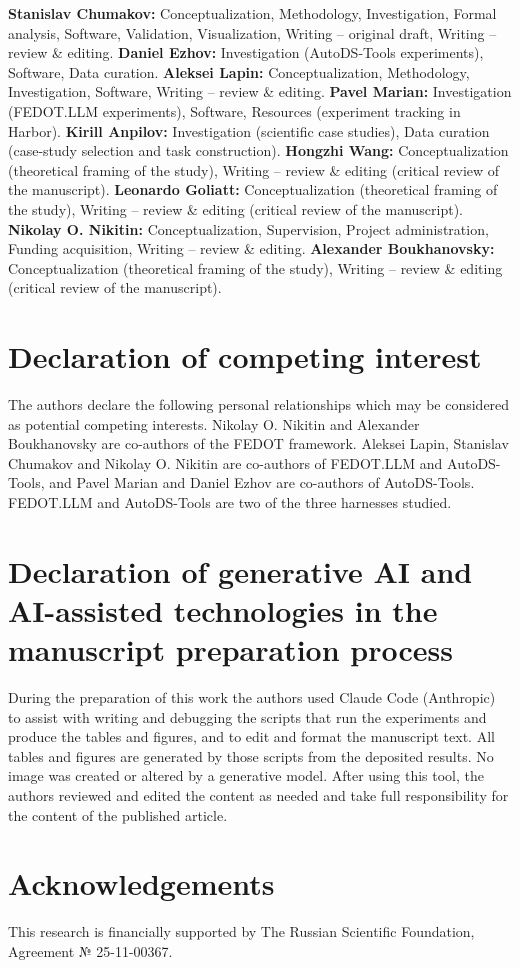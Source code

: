 \textbf{Stanislav Chumakov:} Conceptualization, Methodology, Investigation,
Formal analysis, Software, Validation, Visualization, Writing -- original
draft, Writing -- review \& editing.
\textbf{Daniel Ezhov:} Investigation (AutoDS-Tools experiments), Software,
Data curation.
\textbf{Aleksei Lapin:} Conceptualization, Methodology, Investigation, Software, Writing -- review \& editing.
\textbf{Pavel Marian:} Investigation (FEDOT.LLM experiments), Software,
Resources (experiment tracking in Harbor).
\textbf{Kirill Anpilov:} Investigation (scientific case studies), Data
curation (case-study selection and task construction).
\textbf{Hongzhi Wang:} Conceptualization (theoretical framing of the
study), Writing -- review \& editing (critical review of the manuscript).
\textbf{Leonardo Goliatt:} Conceptualization (theoretical framing of the
study), Writing -- review \& editing (critical review of the manuscript).
\textbf{Nikolay O. Nikitin:} Conceptualization, Supervision, Project
administration, Funding acquisition, Writing -- review \& editing.
\textbf{Alexander Boukhanovsky:} Conceptualization (theoretical framing of
the study), Writing -- review \& editing (critical review of the manuscript).

\section*{Declaration of competing interest}

The authors declare the following personal relationships which may be
considered as potential competing interests. Nikolay O. Nikitin and
Alexander Boukhanovsky are co-authors of the FEDOT framework. Aleksei Lapin,
Stanislav Chumakov and Nikolay O. Nikitin are co-authors of FEDOT.LLM and
AutoDS-Tools, and Pavel Marian and Daniel Ezhov are co-authors of
AutoDS-Tools. FEDOT.LLM and AutoDS-Tools are two of the three harnesses
studied.

\section*{Declaration of generative AI and AI-assisted technologies in the manuscript preparation process}

During the preparation of this work the authors used Claude Code (Anthropic)
to assist with writing and debugging the scripts that run the experiments and
produce the tables and figures, and to edit and format the manuscript text.
All tables and figures are generated by those scripts from the deposited
results. No image was created or altered by a generative model. After using this tool, the authors
reviewed and edited the content as needed and take full responsibility for the
content of the published article.

\section*{Acknowledgements}

This research is financially supported by The Russian Scientific Foundation, Agreement № 25-11-00367.
